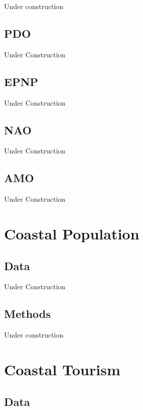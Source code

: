 \documentclass[
]{book}
\begin{document}
Under construction

\hypertarget{pdo}{%
\section{PDO}\label{pdo}}

Under Construction

\hypertarget{epnp}{%
\section{EPNP}\label{epnp}}

Under Construction

\hypertarget{nao}{%
\section{NAO}\label{nao}}

Under Construction

\hypertarget{amo}{%
\section{AMO}\label{amo}}

Under Construction

\hypertarget{coastal-population}{%
\chapter{Coastal Population}\label{coastal-population}}

\hypertarget{data-12}{%
\section{Data}\label{data-12}}

Under Construction

\hypertarget{methods-12}{%
\section{Methods}\label{methods-12}}

Under construction

\hypertarget{coastal-tourism}{%
\chapter{Coastal Tourism}\label{coastal-tourism}}

\hypertarget{data-13}{%
\section{Data}\label{data-13}}
\end{document}
